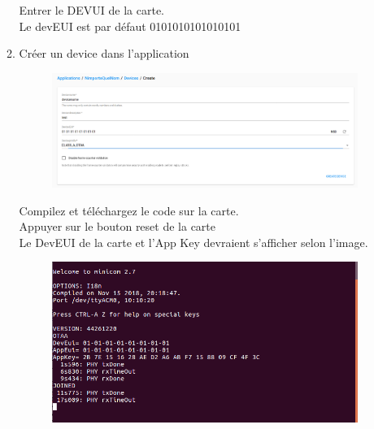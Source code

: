 \documentclass{article}
\begin{document}
\begin{itemize}
\begin{enumerate}
Entrer le DEVUI de la carte.\\
Le devEUI est par défaut 0101010101010101 \\
\item Créer un device dans l'application

\begin{figure}[H]
\begin{center}
\advance\leftskip-3cm
\advance\rightskip-3cm
\includegraphics[keepaspectratio=true,scale=0.3]{loraserver_create_device.png}
\label{visina8}
\end{center}\end{figure}


Compilez et téléchargez le code sur la carte.\\


Appuyer sur le bouton reset de la carte \\

Le DevEUI de la carte et l'App Key devraient s'afficher selon l'image.

 \begin{figure}[H]
\begin{center}
\advance\leftskip-3cm
\advance\rightskip-3cm
\includegraphics[keepaspectratio=true,scale=0.4]{version_deveui_bl072Z.png}
\label{visina8}
\end{center}\end{figure}


\end{enumerate}
\end{itemize}
\end{document}

